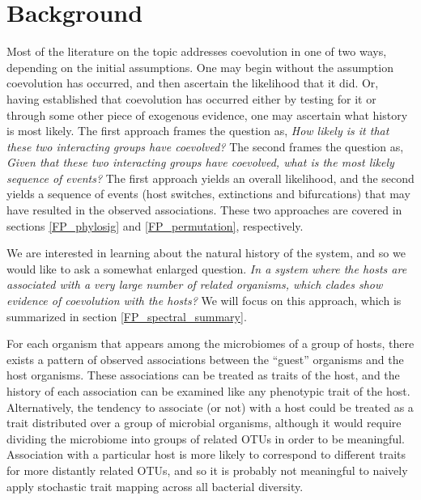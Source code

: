 \section{Background}

Most of the literature on the topic addresses coevolution in one of two ways, depending on the initial assumptions. One may begin without the assumption coevolution has occurred, and then ascertain the likelihood that it did. Or, having established that coevolution has occurred either by testing for it or through some other piece of exogenous evidence, one may ascertain what history is most likely. The first approach frames the question as, {\em How likely is it that these two interacting groups have coevolved?} The second frames the question as, {\em Given that these two interacting groups have coevolved, what is the most likely sequence of events?} The first approach yields an overall likelihood, and the second yields a sequence of events (host switches, extinctions and bifurcations) that may have resulted in the observed associations. These two approaches are covered in sections \ref{FP_phylosig} and \ref{FP_permutation}, respectively.

We are interested in learning about the natural history of the system, and so we would like to ask a somewhat enlarged question. {\em In a system where the hosts are associated with a very large number of related organisms, which clades show evidence of coevolution with the hosts?} We will focus on this approach, which is summarized in section \ref{FP_spectral_summary}.

For each organism that appears among the microbiomes of a group of hosts, there exists a pattern of observed associations between the ``guest'' organisms and the host organisms. These associations can be treated as traits of the host, and the history of each association can be examined like any phenotypic trait of the host. Alternatively, the tendency to associate (or not) with a host could be treated as a trait distributed over a group of microbial organisms, although it would require dividing the microbiome into groups of related OTUs in order to be meaningful. Association with a particular host is more likely to correspond to different traits for more distantly related OTUs, and so it is probably not meaningful to naively apply stochastic trait mapping across all bacterial diversity.


